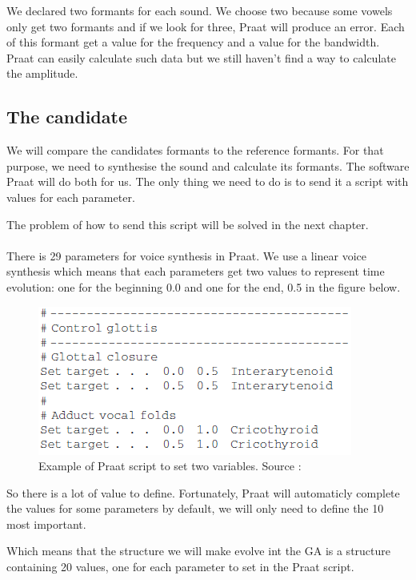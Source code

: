 \documentclass[12pt]{report}
\begin{document}
We declared two formants for each sound. We choose two because some vowels only get two formants and if we look for three, Praat will produce an error. Each of this formant get a value for the frequency and a value for the bandwidth. Praat can easily calculate such data but we still haven't find a way to calculate the amplitude.

\subsection{The candidate}
We will compare the candidates formants to the reference formants. For that purpose, we need to synthesise the sound and calculate its formants. The software Praat will do both for us. The only thing we need to do is to send it a script with values for each parameter.

The problem of how to send this script will be solved in the next chapter.

\paragraph*{}
There is 29 parameters for voice synthesis in Praat. We use a linear voice synthesis which means that each parameters get two values to represent time evolution: one for the beginning 0.0 and one for the end, 0.5 in the figure below.

\begin{figure}[h]
\begin{center}
\includegraphics{resources/praatScript.png} 
\end{center}
\caption{Example of Praat script to set two variables. Source : \cite{ref5}}
\label{praatScript}
\end{figure}

So there is a lot of value to define. Fortunately, Praat will automaticly complete the values for some parameters by default, we will only need to define the 10 most important.

Which means that the structure we will make evolve int the GA is a structure containing 20 values, one for each parameter to set in the Praat script.
\end{document}
